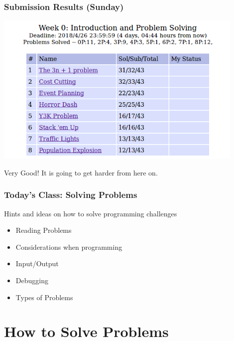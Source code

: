\documentclass{beamer}
\begin{document}
\begin{frame}
  \frametitle{Submission Results (Sunday)}

  \begin{center}
    \includegraphics[width=0.9\textwidth]{img/resultsW0}
  \end{center}

  \begin{block}{}
    Very Good! It is going to get harder from here on.
  \end{block}
  
\end{frame}

\begin{frame}
  \frametitle{Today's Class: Solving Problems}
  \begin{block}{}
    Hints and ideas on how to solve programming challenges
  \end{block}

  \bigskip

  \begin{itemize}
  \item Reading Problems
  \item Considerations when programming
  \item Input/Output
  \item Debugging
  \item Types of Problems
  \end{itemize}
\end{frame}

\section{How to Solve Problems}
\end{document}
